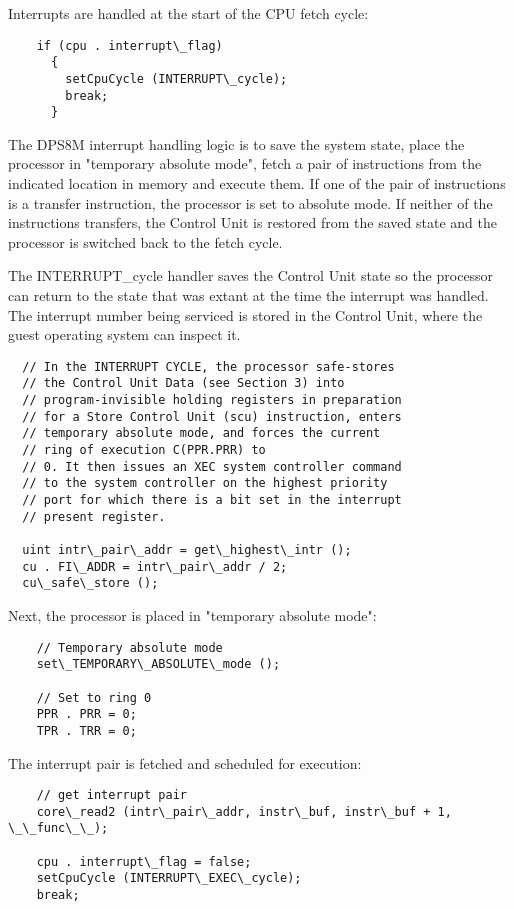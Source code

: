 \documentclass[notitlepage]{report}
\begin{document}
Interrupts are handled at the start of the CPU fetch cycle:

\begin{verbatim}
    if (cpu . interrupt\_flag)
      {
        setCpuCycle (INTERRUPT\_cycle);
        break;
      }
\end{verbatim}

The DPS8M interrupt handling logic is to save the system state, place the processor in "temporary absolute 
mode", fetch a pair of instructions from the indicated location in memory and execute them. If one
of the pair of instructions is a transfer instruction, the processor is set to absolute mode. If
neither of the instructions transfers, the Control Unit is restored from the saved state and the
processor is switched back to the fetch cycle.

The INTERRUPT\_cycle handler saves the Control Unit state so the processor can return to the
state that was extant at the time the interrupt was handled. The interrupt number being serviced
is stored in the Control Unit, where the guest operating system can inspect it.

\begin{verbatim}
  // In the INTERRUPT CYCLE, the processor safe-stores
  // the Control Unit Data (see Section 3) into 
  // program-invisible holding registers in preparation 
  // for a Store Control Unit (scu) instruction, enters 
  // temporary absolute mode, and forces the current 
  // ring of execution C(PPR.PRR) to
  // 0. It then issues an XEC system controller command 
  // to the system controller on the highest priority 
  // port for which there is a bit set in the interrupt 
  // present register.  

  uint intr\_pair\_addr = get\_highest\_intr ();
  cu . FI\_ADDR = intr\_pair\_addr / 2;
  cu\_safe\_store ();
\end{verbatim}

Next, the processor is placed in  "temporary absolute mode":

\begin{verbatim}
    // Temporary absolute mode
    set\_TEMPORARY\_ABSOLUTE\_mode ();

    // Set to ring 0
    PPR . PRR = 0;
    TPR . TRR = 0;
\end{verbatim}

The interrupt pair is fetched and scheduled for execution:

\begin{verbatim}
    // get interrupt pair
    core\_read2 (intr\_pair\_addr, instr\_buf, instr\_buf + 1, \_\_func\_\_);

    cpu . interrupt\_flag = false;
    setCpuCycle (INTERRUPT\_EXEC\_cycle);
    break;
\end{verbatim}
\end{document}
